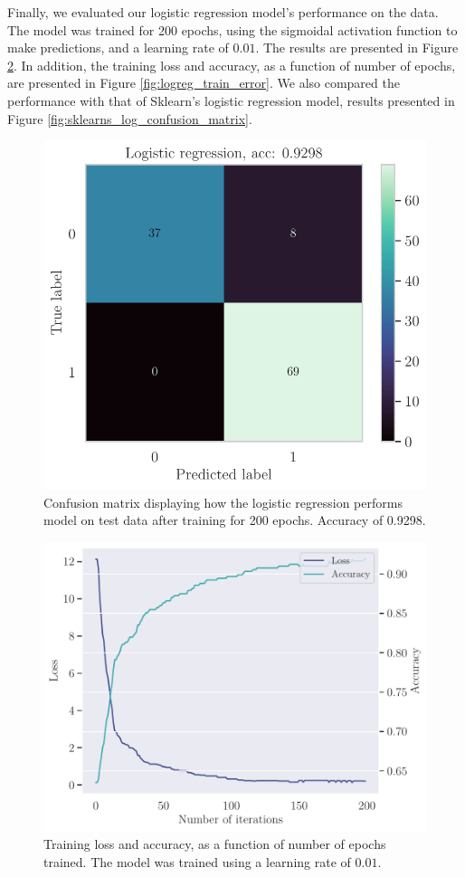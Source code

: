 Finally, we evaluated our logistic regression model's performance on the data. The model was trained for 200 epochs, using the sigmoidal activation function to make predictions, and a learning rate of $0.01$. The results are presented in Figure \ref{fig:logreg_confusion_matrix}. In addition, the training loss and accuracy, as a function of number of epochs, are presented in Figure \ref{fig:logreg_train_error}. We also compared the performance with that of Sklearn's logistic regression model, results presented in Figure \ref{fig:sklearns_log_confusion_matrix}. 
\begin{figure}
    \centering
    \includegraphics[width=0.9\linewidth]{latex/figures/logreg_confusion_matrix.pdf}
    \caption{Confusion matrix displaying how the logistic regression performs model on test data after training for 200 epochs. Accuracy of 0.9298.}
    \label{fig:logreg_confusion_matrix}
\end{figure}
\begin{figure}
    \centering
    \includegraphics[width=\linewidth]{latex/figures/logreg_loss_acc.pdf}
    \caption{Training loss and accuracy, as a function of number of epochs trained. The model was trained using a learning rate of $0.01$.}
    \label{fig:logreg_confusion_matrix}
\end{figure}
